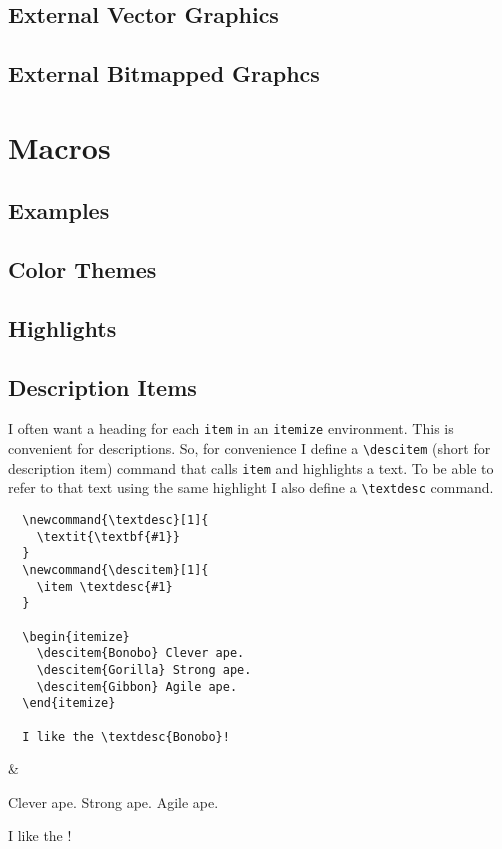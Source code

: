 \subsection{External Vector Graphics}
\subsection{External Bitmapped Graphcs}

\section{Macros}


\subsection{Examples}

\subsection{Color Themes}
\subsection{Highlights}
\subsection{Description Items}

I often want a heading for each \texttt{item} in an \texttt{itemize} environment. This is convenient for descriptions. So, for convenience I define a \texttt{\textbackslash descitem} (short for description item) command that calls \texttt{item} and highlights a text. To be able to refer to that text using the same highlight I also define a \texttt{\textbackslash textdesc} command.

\begin{latexdemo}
  \begin{verbatim}
  \newcommand{\textdesc}[1]{
    \textit{\textbf{#1}}
  }
  \newcommand{\descitem}[1]{
    \item \textdesc{#1}
  }
  
  \begin{itemize}
    \descitem{Bonobo} Clever ape.
    \descitem{Gorilla} Strong ape.
    \descitem{Gibbon} Agile ape.
  \end{itemize}
  
  I like the \textdesc{Bonobo}!
  \end{verbatim}
  &
  \begin{itemize}
     Clever ape.
     Strong ape.
     Agile ape.
  \end{itemize}
  
  I like the !
\end{latexdemo}

